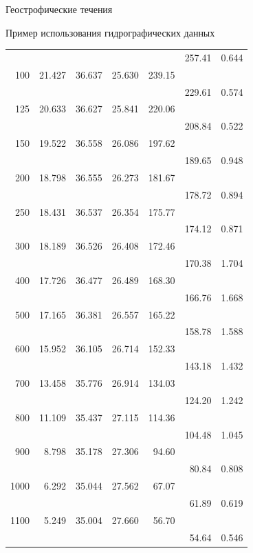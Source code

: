 \begin{chapter}{Геострофические течения}
\begin{section}{Пример использования гидрографических данных}
\begin{table}[t!]
\begin{small}
\begin{center}
\begin{tabular}{rrrrrrl}
 &            &       &       &       & 257.41& 0.644\\
100&    21.427& 36.637& 25.630& 239.15& \\
 &            &       &       &       & 229.61& 0.574\\
125&    20.633& 36.627& 25.841& 220.06& \\
 &            &       &       &       & 208.84& 0.522\\
150&    19.522& 36.558& 26.086& 197.62& \\
 &            &       &       &       & 189.65& 0.948\\
200&    18.798& 36.555& 26.273& 181.67& \\
 &            &       &       &       & 178.72& 0.894\\
250&    18.431& 36.537& 26.354& 175.77& \\
 &            &       &       &       & 174.12& 0.871\\
300&    18.189& 36.526& 26.408& 172.46& \\
 &            &       &       &       & 170.38& 1.704\\
400&    17.726& 36.477& 26.489& 168.30& \\
 &            &       &       &       & 166.76& 1.668\\
500&    17.165& 36.381& 26.557& 165.22& \\
 &            &       &       &       & 158.78& 1.588\\
600&    15.952& 36.105& 26.714& 152.33& \\
 &            &       &       &       & 143.18& 1.432\\
700&    13.458& 35.776& 26.914& 134.03& \\
 &            &       &       &       & 124.20& 1.242\\
800&    11.109& 35.437& 27.115& 114.36& \\
 &            &       &       &       & 104.48& 1.045\\
900&    8.798&  35.178& 27.306& 94.60&  \\
 &            &       &       &       & 80.84&  0.808\\
1000&   6.292&  35.044& 27.562& 67.07&  \\
 &            &       &       &       & 61.89&  0.619\\
1100&   5.249&  35.004& 27.660& 56.70&  \\
 &            &       &       &       & 54.64&  0.546\\

\end{tabular}
\end{center}
\end{small}
\end{table}
\end{section}
\end{chapter}
